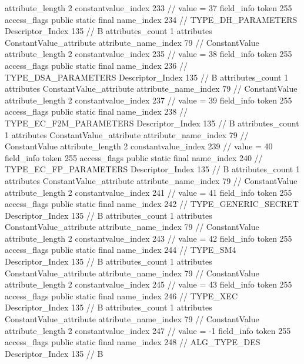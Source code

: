{{{{{{{					attribute_length	2
					constantvalue_index	233		// value = 37
				}
				}
			}
			field_info {
				token	255
				access_flags	public static final
				name_index	234		// TYPE_DH_PARAMETERS
				Descriptor_Index	135		// B
				attributes_count	1
				attributes {
				ConstantValue_attribute {
					attribute_name_index	79		// ConstantValue
					attribute_length	2
					constantvalue_index	235		// value = 38
				}
				}
			}
			field_info {
				token	255
				access_flags	public static final
				name_index	236		// TYPE_DSA_PARAMETERS
				Descriptor_Index	135		// B
				attributes_count	1
				attributes {
				ConstantValue_attribute {
					attribute_name_index	79		// ConstantValue
					attribute_length	2
					constantvalue_index	237		// value = 39
				}
				}
			}
			field_info {
				token	255
				access_flags	public static final
				name_index	238		// TYPE_EC_F2M_PARAMETERS
				Descriptor_Index	135		// B
				attributes_count	1
				attributes {
				ConstantValue_attribute {
					attribute_name_index	79		// ConstantValue
					attribute_length	2
					constantvalue_index	239		// value = 40
				}
				}
			}
			field_info {
				token	255
				access_flags	public static final
				name_index	240		// TYPE_EC_FP_PARAMETERS
				Descriptor_Index	135		// B
				attributes_count	1
				attributes {
				ConstantValue_attribute {
					attribute_name_index	79		// ConstantValue
					attribute_length	2
					constantvalue_index	241		// value = 41
				}
				}
			}
			field_info {
				token	255
				access_flags	public static final
				name_index	242		// TYPE_GENERIC_SECRET
				Descriptor_Index	135		// B
				attributes_count	1
				attributes {
				ConstantValue_attribute {
					attribute_name_index	79		// ConstantValue
					attribute_length	2
					constantvalue_index	243		// value = 42
				}
				}
			}
			field_info {
				token	255
				access_flags	public static final
				name_index	244		// TYPE_SM4
				Descriptor_Index	135		// B
				attributes_count	1
				attributes {
				ConstantValue_attribute {
					attribute_name_index	79		// ConstantValue
					attribute_length	2
					constantvalue_index	245		// value = 43
				}
				}
			}
			field_info {
				token	255
				access_flags	public static final
				name_index	246		// TYPE_XEC
				Descriptor_Index	135		// B
				attributes_count	1
				attributes {
				ConstantValue_attribute {
					attribute_name_index	79		// ConstantValue
					attribute_length	2
					constantvalue_index	247		// value = -1
				}
				}
			}
			field_info {
				token	255
				access_flags	public static final
				name_index	248		// ALG_TYPE_DES
				Descriptor_Index	135		// B
}}}}}
